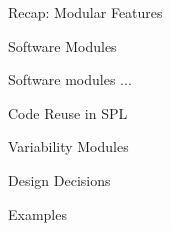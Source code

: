 \begin{frame}{Recap: Modular Features}
	
	

\end{frame}


\begin{frame}{Software Modules}
	\begin{fancycolumns}

	\begin{definition}{Software modules ...}
		\end{definition}
	\end{fancycolumns}
\end{frame}



\begin{frame}{Code Reuse in SPL}
	\begin{fancycolumns}
		
	\end{fancycolumns}
\end{frame}



\begin{frame}{Variability Modules}
	\begin{fancycolumns}
		
	\end{fancycolumns}
\end{frame}


\begin{frame}{Design Decisions}
	\begin{fancycolumns}
		
	\end{fancycolumns}
\end{frame}


\begin{frame}{Examples}
	\begin{fancycolumns}
		
	\end{fancycolumns}
\end{frame}


